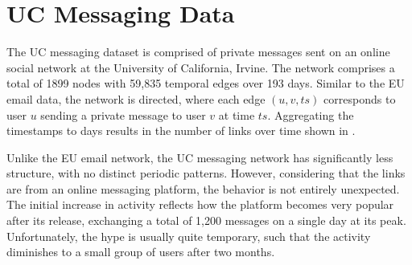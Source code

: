 \section{UC Messaging Data}

The UC messaging dataset is comprised of private messages sent on an online social network at the University of California, Irvine. The network comprises a total of 1899 nodes with 59,835 temporal edges over 193 days. Similar to the EU email data, the network is directed, where each edge $(u,v,ts)$ corresponds to user $u$ sending a private message to user $v$ at time $ts$. Aggregating the timestamps to days results in the number of links over time shown in .


Unlike the EU email network, the UC messaging network has significantly less structure, with no distinct periodic patterns. However, considering that the links are from an online messaging platform, the behavior is not entirely unexpected. The initial increase in activity reflects how the platform becomes very popular after its release, exchanging a total of 1,200 messages on a single day at its peak. Unfortunately, the hype is usually quite temporary, such that the activity diminishes to a small group of users after two months. 